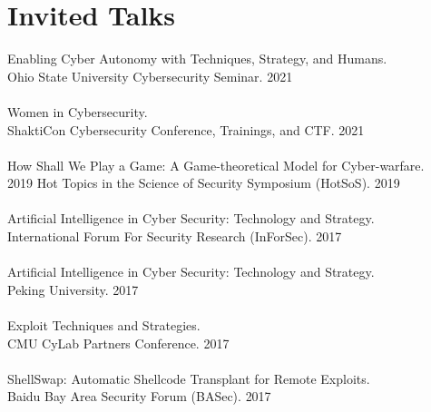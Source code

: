 
\section{Invited Talks}
Enabling Cyber Autonomy with Techniques, Strategy, and Humans. \\
Ohio State University Cybersecurity Seminar. \hfill{2021}
\\\\

Women in Cybersecurity.\\
ShaktiCon Cybersecurity Conference, Trainings, and CTF. \hfill{2021}
\\\\

How Shall We Play a Game: A Game-theoretical Model for
Cyber-warfare. \\
2019 Hot Topics in the Science of Security Symposium (HotSoS). \hfill{2019} 
\\\\

Artificial Intelligence in Cyber Security: Technology and
Strategy. \\
International Forum For Security Research (InForSec). \hfill{2017}
\\\\
Artificial Intelligence in Cyber Security: Technology and
Strategy. \\
Peking University. \hfill{2017}
\\\\
Exploit Techniques and Strategies. \\
CMU CyLab Partners Conference.
\hfill{2017}
\\\\
ShellSwap: Automatic Shellcode Transplant for Remote Exploits. \\
Baidu Bay Area Security Forum (BASec).
\hfill{2017}
